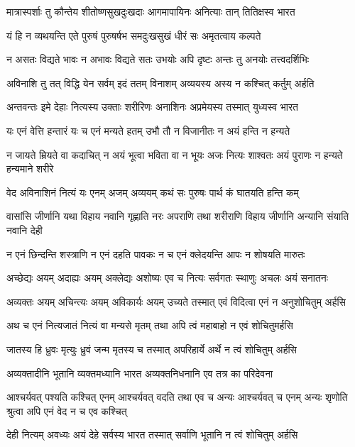 \twolineshloka
{मात्रास्पर्शाः तु कौन्तेय शीतोष्णसुखदुःखदाः}
{आगमापायिनः अनित्याः तान् तितिक्षस्व भारत}%

\twolineshloka
{यं हि न व्यथयन्ति एते पुरुषं पुरुषर्षभ}
{समदुःखसुखं धीरं सः अमृतत्वाय कल्पते}%

\twolineshloka
{न असतः विद्यते भावः न अभावः विद्यते सतः}
{उभयोः अपि दृष्टः अन्तः तु अनयोः तत्त्वदर्शिभिः}%

\twolineshloka
{अविनाशि तु तत् विद्धि येन सर्वम् इदं ततम्}
{विनाशम् अव्ययस्य अस्य न कश्चित् कर्तुम् अर्हति}%

\twolineshloka
{अन्तवन्तः इमे देहाः नित्यस्य उक्ताः शरीरिणः}
{अनाशिनः अप्रमेयस्य तस्मात् युध्यस्व भारत}%

\twolineshloka
{यः एनं वेत्ति हन्तारं यः च एनं मन्यते हतम्}
{उभौ तौ न विजानीतः न अयं हन्ति न हन्यते}%

\fourlineindentedshloka
{न जायते म्रियते वा कदाचित्}
{न अयं भूत्वा भविता वा न भूयः}
{अजः नित्यः शाश्वतः अयं पुराणः}
{न हन्यते हन्यमाने शरीरे}%

\twolineshloka
{वेद अविनाशिनं नित्यं यः एनम् अजम् अव्ययम्}
{कथं सः पुरुषः पार्थ कं घातयति हन्ति कम्}%

\fourlineindentedshloka
{वासांसि जीर्णानि यथा विहाय}
{नवानि गृह्णाति नरः अपराणि}
{तथा शरीराणि विहाय जीर्णानि}
{अन्यानि संयाति नवानि देही}%

\twolineshloka
{न एनं छिन्दन्ति शस्त्राणि न एनं दहति पावकः}
{न च एनं क्लेदयन्ति आपः न शोषयति मारुतः}%

\twolineshloka
{अच्छेद्यः अयम् अदाह्यः अयम् अक्लेद्यः अशोष्यः एव च}
{नित्यः सर्वगतः स्थाणुः अचलः अयं सनातनः}%

\twolineshloka
{अव्यक्तः अयम् अचिन्त्यः अयम् अविकार्यः अयम् उच्यते}
{तस्मात् एवं विदित्वा एनं न अनुशोचितुम् अर्हसि}%

\twolineshloka
{अथ च एनं नित्यजातं नित्यं वा मन्यसे मृतम्}
{तथा अपि त्वं महाबाहो न एवं शोचितुमर्हसि}%

\twolineshloka
{जातस्य हि ध्रुवः मृत्युः ध्रुवं जन्म मृतस्य च}
{तस्मात् अपरिहार्ये अर्थे न त्वं शोचितुम् अर्हसि}%

\twolineshloka
{अव्यक्तादीनि भूतानि व्यक्तमध्यानि भारत}
{अव्यक्तनिधनानि एव तत्र का परिदेवना}%

\fourlineindentedshloka
{आश्चर्यवत् पश्यति कश्चित् एनम्}
{आश्चर्यवत् वदति तथा एव च अन्यः}
{आश्चर्यवत् च एनम् अन्यः शृणोति}
{श्रुत्वा अपि एनं वेद न च एव कश्चित्}%

\twolineshloka
{देही नित्यम् अवध्यः अयं देहे सर्वस्य भारत}
{तस्मात् सर्वाणि भूतानि न त्वं शोचितुम् अर्हसि}%

